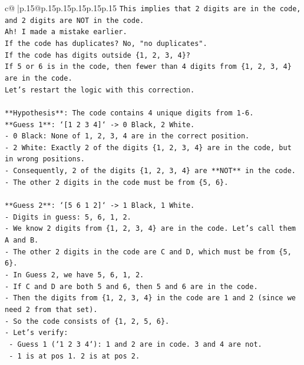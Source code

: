 \documentclass{article}
\begin{document}
{\begin{supertabular}{c@{$\;$}|p{.15\linewidth}@{}p{.15\linewidth}p{.15\linewidth}p{.15\linewidth}p{.15\linewidth}p{.15\linewidth}}
{{{\texttt{This implies that 2 digits are in the code, and 2 digits are NOT in the code.} \\
\texttt{Ah! I made a mistake earlier.} \\
\texttt{If the code has duplicates? No, "no duplicates".} \\
\texttt{If the code has digits outside \{1, 2, 3, 4\}?} \\
\texttt{If 5 or 6 is in the code, then fewer than 4 digits from \{1, 2, 3, 4\} are in the code.} \\
\texttt{Let's restart the logic with this correction.} \\
\\ 
\texttt{**Hypothesis**: The code contains 4 unique digits from 1{-}6.} \\
\texttt{**Guess 1**: `{[}1 2 3 4{]}` {-}> 0 Black, 2 White.} \\
\texttt{{-} 0 Black: None of 1, 2, 3, 4 are in the correct position.} \\
\texttt{{-} 2 White: Exactly 2 of the digits \{1, 2, 3, 4\} are in the code, but in wrong positions.} \\
\texttt{{-} Consequently, 2 of the digits \{1, 2, 3, 4\} are **NOT** in the code.} \\
\texttt{{-} The other 2 digits in the code must be from \{5, 6\}.} \\
\\ 
\texttt{**Guess 2**: `{[}5 6 1 2{]}` {-}> 1 Black, 1 White.} \\
\texttt{{-} Digits in guess: 5, 6, 1, 2.} \\
\texttt{{-} We know 2 digits from \{1, 2, 3, 4\} are in the code. Let's call them A and B.} \\
\texttt{{-} The other 2 digits in the code are C and D, which must be from \{5, 6\}.} \\
\texttt{{-} In Guess 2, we have 5, 6, 1, 2.} \\
\texttt{{-} If C and D are both 5 and 6, then 5 and 6 are in the code.} \\
\texttt{{-} Then the digits from \{1, 2, 3, 4\} in the code are 1 and 2 (since we need 2 from that set).} \\
\texttt{{-} So the code consists of \{1, 2, 5, 6\}.} \\
\texttt{{-} Let's verify:} \\
\texttt{    {-} Guess 1 (`1 2 3 4`): 1 and 2 are in code. 3 and 4 are not.} \\
\texttt{    {-} 1 is at pos 1. 2 is at pos 2.} \\
}}}
\end{supertabular}}
\end{document}
